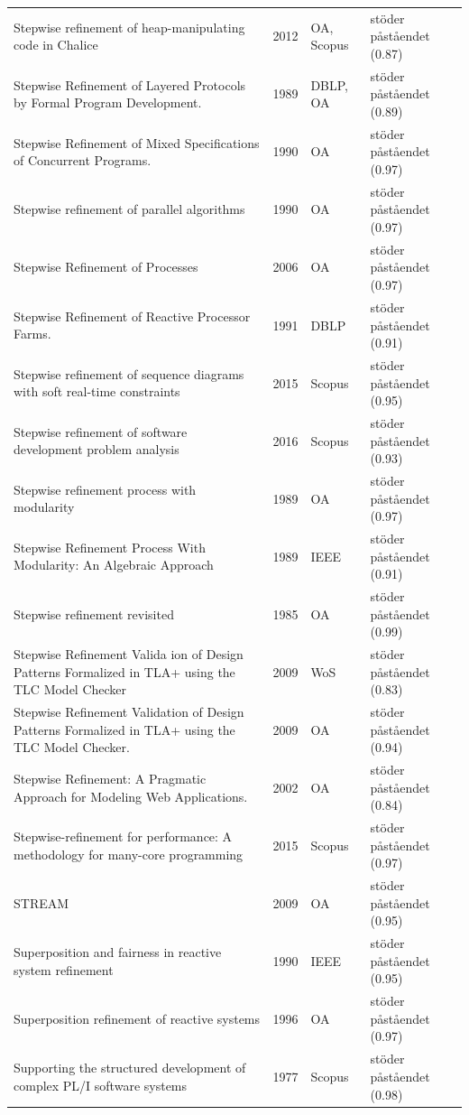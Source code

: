 \begin{longtable}{@{}%
  >{\raggedright\arraybackslash}p{}c%
  >{\raggedright\arraybackslash}p{}%
  >{\raggedright\arraybackslash}p{}@{}}
Stepwise refinement of heap-manipulating code in Chalice & 2012 & OA, Scopus & stöder påståendet (0.87) \\
Stepwise Refinement of Layered Protocols by Formal Program Development. & 1989 & DBLP, OA & stöder påståendet (0.89) \\
Stepwise Refinement of Mixed Specifications of Concurrent Programs. & 1990 & OA & stöder påståendet (0.97) \\
Stepwise refinement of parallel algorithms & 1990 & OA & stöder påståendet (0.97) \\
Stepwise Refinement of Processes & 2006 & OA & stöder påståendet (0.97) \\
Stepwise Refinement of Reactive Processor Farms. & 1991 & DBLP & stöder påståendet (0.91) \\
Stepwise refinement of sequence diagrams with soft real-time constraints & 2015 & Scopus & stöder påståendet (0.95) \\
Stepwise refinement of software development problem analysis & 2016 & Scopus & stöder påståendet (0.93) \\
Stepwise refinement process with modularity & 1989 & OA & stöder påståendet (0.97) \\
Stepwise Refinement Process With Modularity: An Algebraic Approach & 1989 & IEEE & stöder påståendet (0.91) \\
Stepwise refinement revisited & 1985 & OA & stöder påståendet (0.99) \\
Stepwise Refinement Valida ion of Design Patterns Formalized in TLA+ using the TLC Model Checker & 2009 & WoS & stöder påståendet (0.83) \\
Stepwise Refinement Validation of Design Patterns Formalized in TLA+ using the TLC Model Checker. & 2009 & OA & stöder påståendet (0.94) \\
Stepwise Refinement: A Pragmatic Approach for Modeling Web Applications. & 2002 & OA & stöder påståendet (0.84) \\
Stepwise-refinement for performance: A methodology for many-core programming & 2015 & Scopus & stöder påståendet (0.97) \\
STREAM & 2009 & OA & stöder påståendet (0.95) \\
Superposition and fairness in reactive system refinement & 1990 & IEEE & stöder påståendet (0.95) \\
Superposition refinement of reactive systems & 1996 & OA & stöder påståendet (0.97) \\
Supporting the structured development of complex PL/I software systems & 1977 & Scopus & stöder påståendet (0.98) \\

\end{longtable}
